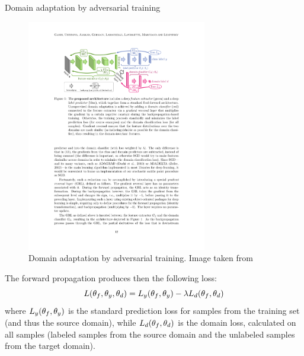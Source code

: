 \documentclass[xcolor=pdftex,dvipsnames,table]{beamer}
\begin{document}
\begin{frame}[noframenumbering]{Domain adaptation by adversarial training}
\begin{figure}[htb]
   \centering
   \includegraphics[width=0.7\textwidth]{../graphics/domain_adaptation.pdf}
   \caption{Domain adaptation by adversarial training. Image taken from \cite{Ganin2016}}
\end{figure}
The forward propagation produces then the following loss: 
\begin{equation}
L(\theta_f, \theta_y, \theta_d) = L_y(\theta_f, \theta_y) - \lambda L_d(\theta_f, \theta_d) 
\end{equation}
where $L_y(\theta_f, \theta_y)$ is the standard prediction loss for samples from the training set (and thus the source domain), while $L_d(\theta_f, \theta_d)$ is the domain loss, calculated on all samples (labeled samples from the source domain and the unlabeled samples from the target domain). 
\end{frame}
\end{document}
